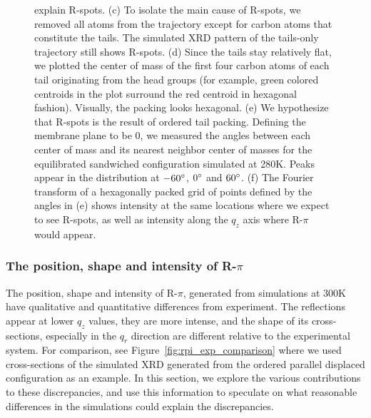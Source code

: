 \documentclass[journal=jpcbfk,manuscript=article]{achemso}
\begin{document}
\begin{figure}[!htb]
{      explain R-spots. (c) To isolate the main cause of R-spots, we removed all atoms
      from the trajectory except for carbon atoms that constitute the tails. The
      simulated XRD pattern of the tails-only trajectory still shows R-spots. (d)
      Since the tails stay relatively flat, we plotted the center of mass of the first
      four carbon atoms of each tail originating from the head groups (for example,
      green colored centroids in the plot surround the red centroid in hexagonal fashion).
      Visually, the packing looks hexagonal. (e) We hypothesize
      that R-spots is the result of ordered tail packing. Defining
      the membrane plane to be 0\degree, we measured the angles between each center of 
      mass and its nearest neighbor center of masses for the equilibrated 
      sandwiched configuration simulated at 280K. Peaks appear in the distribution at 
      $-60\degree$, $0\degree$ and $60\degree$. (f) The Fourier transform of a hexagonally
      packed grid of points defined by the angles in (e) shows intensity at the same
      locations where we expect to see R-spots, as well as intensity along the $q_z$ axis
      where R-$\pi$ would appear.}~\label{fig:tail_packing}
  \end{figure}  

  \subsubsection{The position, shape and intensity of R-$\pi$}\label{section:rpi}

  The position, shape and intensity of R-$\pi$, generated from simulations at
  300K have qualitative and quantitative differences from experiment.
  The reflections appear at lower $q_z$ values, they
  are more intense, and the shape of its cross-sections, especially in the $q_r$
  direction are different relative to the experimental system.  For comparison,
  see Figure~\ref{fig:rpi_exp_comparison} where we used cross-sections of the
  simulated XRD generated from the ordered parallel displaced configuration as an
  example. In this section, we explore the various contributions to these
  discrepancies, and use this information to speculate on what reasonable
  differences in the simulations could explain the discrepancies.
  
\end{document}
